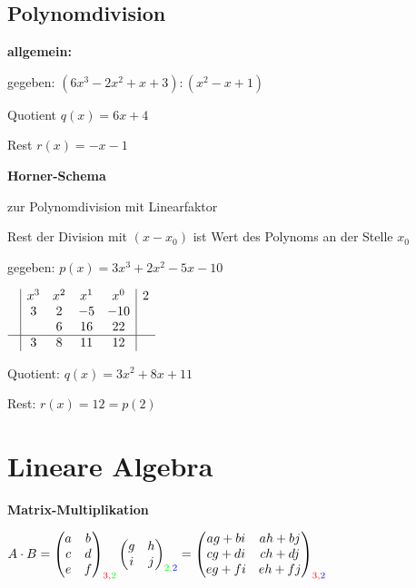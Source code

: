 \subsection{Polynomdivision}

\textbf{allgemein:}

gegeben: $(6x^3-2x^2+x+3) : (x^2-x+1)$


Quotient $q(x) = 6x + 4$

Rest $r(x) = - x - 1$

\textbf{Horner-Schema}

zur Polynomdivision mit Linearfaktor

Rest der Division mit $(x - x_0)$ ist Wert des Polynoms an der Stelle $x_0$

gegeben: $p(x) = 3x^3 + 2x^2 - 5x - 10$

$\begin{array}{c|cccc|c}
    & x^3 & x^2 & x^1 & x^0 & 2\\
    & 3   & 2   & -5  & -10 & \\
    &     & 6   & 16  & 22  \\ \hline
    & 3   & 8   & 11  & \multicolumn{1}{c|}{12}   &
\end{array}$

Quotient: $q(x) = 3x^2 + 8x + 11$

Rest: $r(x) = 12 = p(2)$

\section{Lineare Algebra}

\textbf{Matrix-Multiplikation}

$\displaystyle{
    A \cdot B = 
    \begin{pmatrix}
        a & b\\
        c & d\\
        e & f
    \end{pmatrix}_{\color{red} 3 , \color{green} 2 }
    \begin{pmatrix}
        g & h\\
        i & j
    \end{pmatrix}_{\color{green} 2, \color{blue} 2}
    = 
    \begin{pmatrix}
        a g + b i & a h + b j\\
        c g + d i & c h + d j\\
        e g + f i & e h + f j
    \end{pmatrix}_{\color{red} 3, \color{blue} 2}
}$


